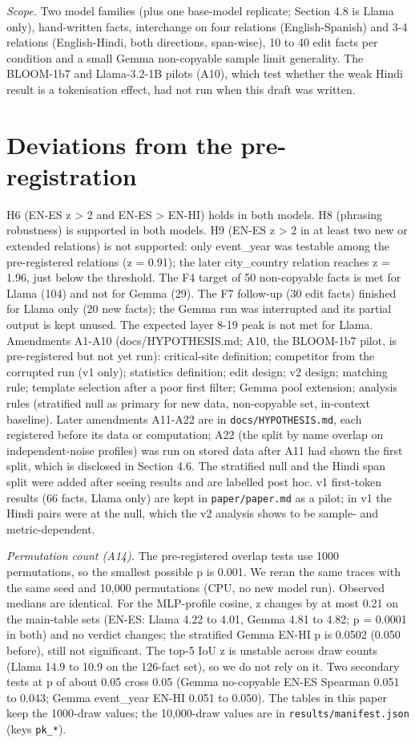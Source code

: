 \documentclass[11pt]{article}
\begin{document}
\emph{Scope.} Two model families (plus one base-model replicate; Section 4.8 is Llama only), hand-written facts, interchange on four relations (English-Spanish) and 3-4 relations (English-Hindi, both directions, span-wise), 10 to 40 edit facts per condition and a small Gemma non-copyable sample limit generality. The BLOOM-1b7 and Llama-3.2-1B pilots (A10), which test whether the weak Hindi result is a tokenisation effect, had not run when this draft was written.

\section{Deviations from the pre-registration}
H6 (EN-ES z \textgreater{} 2 and EN-ES \textgreater{} EN-HI) holds in both models. H8 (phrasing robustness) is supported in both models. H9 (EN-ES z \textgreater{} 2 in at least two new or extended relations) is not supported: only event\_year was testable among the pre-registered relations (z = 0.91); the later city\_country relation reaches z = 1.96, just below the threshold. The F4 target of 50 non-copyable facts is met for Llama (104) and not for Gemma (29). The F7 follow-up (30 edit facts) finished for Llama only (20 new facts); the Gemma run was interrupted and its partial output is kept unused. The expected layer 8-19 peak is not met for Llama. Amendments A1-A10 (docs/HYPOTHESIS.md; A10, the BLOOM-1b7 pilot, is pre-registered but not yet run): critical-site definition; competitor from the corrupted run (v1 only); statistics definition; edit design; v2 design; matching rule; template selection after a poor first filter; Gemma pool extension; analysis rules (stratified null as primary for new data, non-copyable set, in-context baseline). Later amendments A11-A22 are in \texttt{docs/HYPOTHESIS.md}, each registered before its data or computation; A22 (the split by name overlap on independent-noise profiles) was run on stored data after A11 had shown the first split, which is disclosed in Section 4.6. The stratified null and the Hindi span split were added after seeing results and are labelled post hoc. v1 first-token results (66 facts, Llama only) are kept in \texttt{paper/paper.md} as a pilot; in v1 the Hindi pairs were at the null, which the v2 analysis shows to be sample- and metric-dependent.

\emph{Permutation count (A14).} The pre-registered overlap tests use 1000 permutations, so the smallest possible p is 0.001. We reran the same traces with the same seed and 10,000 permutations (CPU, no new model run). Observed medians are identical. For the MLP-profile cosine, z changes by at most 0.21 on the main-table sets (EN-ES: Llama 4.22 to 4.01, Gemma 4.81 to 4.82; p = 0.0001 in both) and no verdict changes; the stratified Gemma EN-HI p is 0.0502 (0.050 before), still not significant. The top-5 IoU z is unstable across draw counts (Llama 14.9 to 10.9 on the 126-fact set), so we do not rely on it. Two secondary tests at p of about 0.05 cross 0.05 (Gemma no-copyable EN-ES Spearman 0.051 to 0.043; Gemma event\_year EN-HI 0.051 to 0.050). The tables in this paper keep the 1000-draw values; the 10,000-draw values are in \texttt{results/manifest.json} (keys \texttt{pk\_*}).
\end{document}

